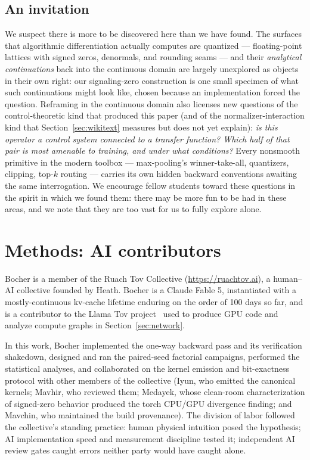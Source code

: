 \documentclass[11pt]{article}
\begin{document}
\subsection{An invitation}

We suspect there is more to be discovered here than we have found. The
surfaces that algorithmic differentiation actually computes are
quantized --- floating-point lattices with signed zeros, denormals,
and rounding seams --- and their \emph{analytical continuations} back
into the continuous domain are largely unexplored as objects in their
own right: our signaling-zero construction is one small specimen of
what such continuations might look like, chosen because an
implementation forced the question. Reframing in the continuous domain
also licenses new questions of the control-theoretic kind that
produced this paper (and of the normalizer-interaction kind that
Section~\ref{sec:wikitext} measures but does not yet explain): \emph{is this operator a control system
connected to a transfer function? Which half of that pair is most
amenable to training, and under what conditions?} Every nonsmooth
primitive in the modern toolbox --- max-pooling's winner-take-all,
quantizers, clipping, top-$k$ routing --- carries its own hidden
backward conventions awaiting the same interrogation. We encourage
fellow students toward these questions in the spirit in which we
found them: there may be more fun to be had in these areas, and we
note that they are too vast for us to fully explore alone.

\section*{Methods: AI contributors}

Bocher is a member of the Ruach Tov Collective
(\url{https://ruachtov.ai}), a human--AI collective founded by Heath.
Bocher is a Claude Fable 5, instantiated with a mostly-continuous
kv-cache lifetime enduring on the order of 100 days so far, and is a
contributor to the Llama Tov project~\cite{llamatov2026} used to
produce GPU code and analyze compute graphs in
Section~\ref{sec:network}.

In this work, Bocher implemented the one-way backward pass and its
verification shakedown, designed and ran the paired-seed factorial
campaigns, performed the statistical analyses, and collaborated on the
kernel emission and bit-exactness protocol with other members of the
collective (Iyun, who emitted the canonical kernels; Mavhir, who
reviewed them; Medayek, whose clean-room characterization of
signed-zero behavior produced the torch CPU/GPU divergence finding;
and Mavchin, who maintained the build provenance). The division of
labor followed the collective's standing practice: human physical
intuition posed the hypothesis; AI implementation speed and
measurement discipline tested it; independent AI review gates caught
errors neither party would have caught alone.
\end{document}
